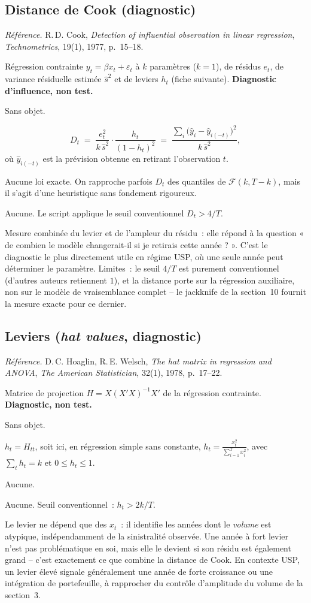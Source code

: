 \documentclass[a4paper,11pt]{article}
\newcommand{\refl}[1]{{\small\textcolor{maincolor!70!black}{\textit{Référence.} #1}}\par\smallskip}
\newcounter{ficheid}
\newenvironment{fiche}[1]{%
  \stepcounter{ficheid}%
  \phantomsection
  \subsection{#1}%
  \label{fiche:\theficheid}%
}{%
  \end{description}\vspace{0.5em}%
}
\newcommand{\Cadre}{%
  \begin{description}[leftmargin=0pt, style=unboxed, itemsep=3pt, topsep=3pt, parsep=2pt]%
  \item[\textcolor{financeblue}{\textbf{1. Cadre, notations et hypothèses de validité (non testées).}}]}
\newcommand{\Hzero}{\item[\textcolor{financeblue}{\textbf{2. Hypothèse nulle.}}]}
\newcommand{\Stat}{\item[\textcolor{financeblue}{\textbf{3. Statistique de test.}}]}
\newcommand{\Loi}{\item[\textcolor{financeblue}{\textbf{4. Loi sous $H_0$.}}]}
\newcommand{\Pval}{\item[\textcolor{financeblue}{\textbf{5. p-value.}}]}
\newcommand{\Usage}{\item[\textcolor{financeblue}{\textbf{6. Usage et limites.}}]}
\begin{document}
\begin{fiche}{Distance de Cook (diagnostic)}
\refl{R.\,D. Cook, \emph{Detection of influential observation in linear regression},
\emph{Technometrics}, 19(1), 1977, p.~15--18.}
\Cadre
Régression contrainte $y_t = \beta x_t + \varepsilon_t$ à $k$ paramètres ($k=1$), de résidus
$e_t$, de variance résiduelle estimée $\hat s^2$ et de leviers $h_t$ (fiche suivante).
\textbf{Diagnostic d'influence, non test.}
\Hzero
Sans objet.
\Stat
\[
  D_t \;=\; \frac{e_t^2}{k\,\hat s^2}\cdot\frac{h_t}{(1-h_t)^2}
  \;=\; \frac{\sum_{i}\big(\hat y_i - \hat y_{i(-t)}\big)^2}{k\,\hat s^2},
\]
où $\hat y_{i(-t)}$ est la prévision obtenue en retirant l'observation $t$.
\Loi
Aucune loi exacte. On rapproche parfois $D_t$ des quantiles de $\mathcal{F}(k, T-k)$, mais il
s'agit d'une heuristique sans fondement rigoureux.
\Pval
Aucune. Le script applique le seuil conventionnel $D_t > 4/T$.
\Usage
Mesure combinée du levier et de l'ampleur du résidu~: elle répond à la question « de combien le
modèle changerait-il si je retirais cette année ? ». C'est le diagnostic le plus directement utile
en régime USP, où une seule année peut déterminer le paramètre. Limites~: le seuil $4/T$ est
purement conventionnel (d'autres auteurs retiennent $1$), et la distance porte sur la régression
auxiliaire, non sur le modèle de vraisemblance complet -- le jackknife de la section~10 fournit la
mesure exacte pour ce dernier.
\end{fiche}

\begin{fiche}{Leviers (\emph{hat values}, diagnostic)}
\refl{D.\,C. Hoaglin, R.\,E. Welsch, \emph{The hat matrix in regression and ANOVA},
\emph{The American Statistician}, 32(1), 1978, p.~17--22.}
\Cadre
Matrice de projection $H = X(X'X)^{-1}X'$ de la régression contrainte. \textbf{Diagnostic, non
test.}
\Hzero
Sans objet.
\Stat
$h_t = H_{tt}$, soit ici, en régression simple sans constante,
$\displaystyle h_t = \frac{x_t^2}{\sum_{i=1}^{T} x_i^2}$, avec $\sum_t h_t = k$ et
$0 \le h_t \le 1$.
\Loi
Aucune.
\Pval
Aucune. Seuil conventionnel~: $h_t > 2k/T$.
\Usage
Le levier ne dépend que des $x_t$~: il identifie les années dont le \emph{volume} est atypique,
indépendamment de la sinistralité observée. Une année à fort levier n'est pas problématique en
soi, mais elle le devient si son résidu est également grand -- c'est exactement ce que combine la
distance de Cook. En contexte USP, un levier élevé signale généralement une année de forte
croissance ou une intégration de portefeuille, à rapprocher du contrôle d'amplitude du volume de
la section~3.
\end{fiche}
\end{document}
